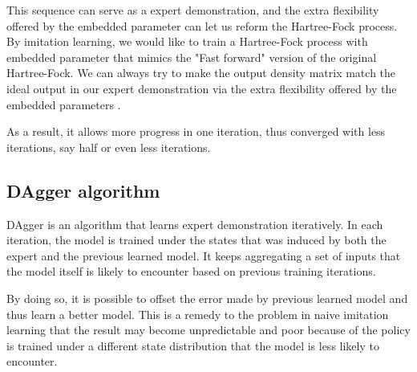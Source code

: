 \documentclass[twoside]{article}
\begin{document}
This sequence can serve as a expert demonstration, and the extra flexibility offered by the embedded parameter can let us reform the Hartree-Fock process. By imitation learning,
we would like to train a Hartree-Fock process with embedded parameter that  mimics the "Fast forward" version of the original Hartree-Fock. 
We can always try to make the output density matrix match the ideal output in our expert demonstration via the extra flexibility offered by the embedded parameters .


As a result, it allows more progress in one iteration, thus converged with less iterations, say half or even less iterations.  








\subsection{DAgger algorithm}
DAgger is an algorithm that learns expert demonstration iteratively. In each iteration, the model is trained under the states that was induced by both the expert and the previous learned model. It keeps aggregating a set of inputs that the model itself is likely to encounter based on previous training iterations.  

By doing so, it is possible to offset the error made by previous learned model and thus learn a better model. This is a remedy to the problem in naive imitation learning that the result may become unpredictable and poor because of the policy is trained under a different state distribution
that the model is less likely to encounter. 
\end{document}
